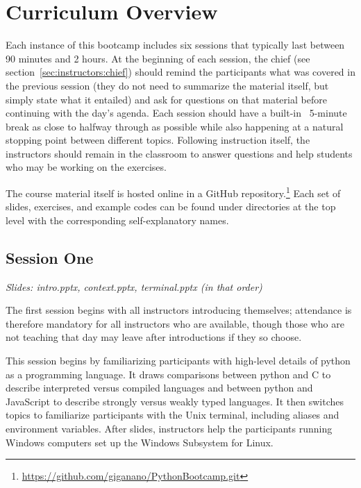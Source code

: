 
\section{Curriculum Overview}
\label{sec:curriculum}
\noindent
Each instance of this bootcamp includes six sessions that typically last
between 90 minutes and 2 hours.
At the beginning of each session, the chief (see
section~\ref{sec:instructors:chief}) should remind the participants what was
covered in the previous session (they do not need to summarize the material
itself, but simply state what it entailed) and ask for questions on that
material before continuing with the day’s agenda.
Each session should have a built-in ~5-minute break as close to halfway through
as possible while also happening at a natural stopping point between different
topics.
Following instruction itself, the instructors should remain in the classroom to
answer questions and help students who may be working on the exercises.
\par
The course material itself is hosted online in a GitHub repository.\footnote{
	\url{https://github.com/giganano/PythonBootcamp.git}
}
Each set of slides, exercises, and example codes can be found under directories
at the top level with the corresponding self-explanatory names.

\subsection{Session One}
\label{sec:curriculum:one}
\noindent
\textit{Slides: intro.pptx, context.pptx, terminal.pptx (in that order)}
\par\noindent
The first session begins with all instructors introducing themselves;
attendance is therefore mandatory for all instructors who are available, though
those who are not teaching that day may leave after introductions if they so
choose.
\par
This session begins by familiarizing participants with high-level details of
python as a programming language.
It draws comparisons between python and C to describe interpreted versus
compiled languages and between python and JavaScript to describe strongly
versus weakly typed languages.
It then switches topics to familiarize participants with the Unix terminal,
including aliases and environment variables.
After slides, instructors help the participants running Windows computers set
up the Windows Subsystem for Linux.

